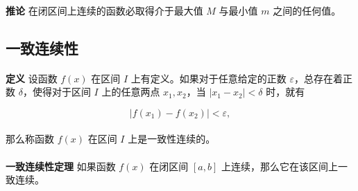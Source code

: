 \paragraph{}
\textbf{推论\;} 在闭区间上连续的函数必取得介于最大值 $M$ 与最小值 $m$ 之间的任何值。

\subsection{一致连续性}
\paragraph{}
\textbf{定义\;} 设函数 $f(x)$ 在区间 $I$ 上有定义。如果对于任意给定的正数 $\varepsilon$，总存在着正数 $\delta$，使得对于区间 $I$ 上的任意两点 $x_1, x_2$，当 $|x_1 - x_2| < \delta$ 时，就有

\begin{equation}
|f(x_1) - f(x_2)| < \varepsilon,
\end{equation}

\paragraph{}
那么称函数 $f(x)$ 在区间 $I$ 上是一致性连续的。

\paragraph{}
\textbf{一致连续性定理\;} 如果函数 $f(x)$ 在闭区间 $[a,b]$ 上连续，那么它在该区间上一致连续。
